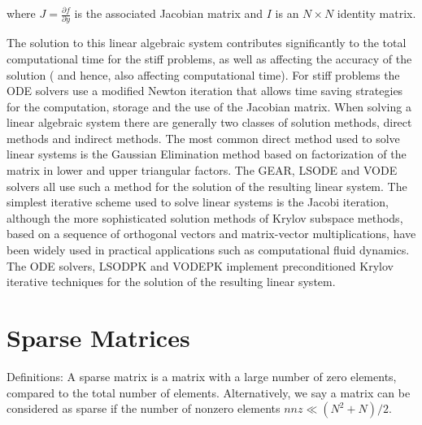 where $J = \frac{\partial{f}}{\partial{y}}$ is the associated Jacobian matrix
and $I$ is an $N \times N$ identity matrix.

\newpage
The solution to this linear algebraic system contributes significantly to the
total computational time for the stiff problems, as well as affecting the
accuracy of the solution ( and hence, also affecting computational time).  For
stiff problems the ODE solvers use a modified Newton iteration that allows time
saving strategies for the computation, storage and the use of the Jacobian
matrix.  When solving a linear algebraic system there are generally two classes
of solution methods, direct methods and indirect methods.  The most common
direct method used to solve linear systems is the Gaussian Elimination method
based on factorization of the matrix in lower and upper triangular factors. The
GEAR, LSODE and VODE solvers all use such a method for the solution of the
resulting linear system.  The simplest iterative scheme used to solve linear
systems is the Jacobi iteration, although the more sophisticated solution
methods of Krylov subspace methods, based on a sequence of orthogonal vectors
and matrix-vector multiplications, have been widely used in practical
applications such as computational fluid dynamics.  The ODE solvers, LSODPK and
VODEPK implement preconditioned Krylov iterative techniques for the solution of
the resulting linear system.

\section{Sparse Matrices}

Definitions: A sparse matrix is a matrix with a large number of zero elements,
compared to the total number of elements. Alternatively, we say a matrix can be
considered as sparse if the number of nonzero elements $nnz \ll (N^{2} + N)/2$.

